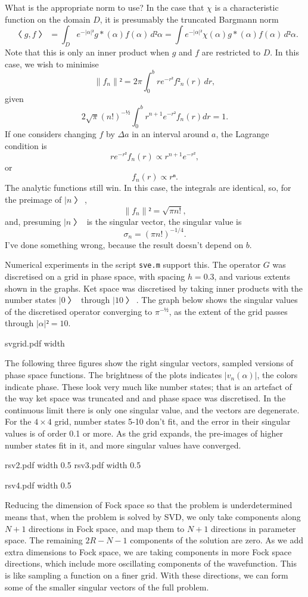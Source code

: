 What is the appropriate norm to use?  In the case that $χ$ is a characteristic function on the domain $D$, it is presumably the truncated Bargmann norm
$$〈g,f〉=\int_D e^{-|α|²}g*(α)f(α)\,d²α=\int e^{-|α|²}χ(α)g*(α)f(α)\,d²α.$$
Note that this is only an inner product when $g$ and $f$ are restricted to $D$.  In this case, we wish to minimise 
$$\|f_n\|²=2π\int_0^b re^{-r²}f²_n(r)\,dr,$$
given 
$$2\sqrt π(n!)^{-½}\int_0^b r^{n+1}e^{-r²}f_n(r)dr=1.$$
If one considers changing $f$ by $Δa$ in an interval around $a$, the Lagrange condition is
$$re^{-r²}f_n(r)\propto r^{n+1}e^{-r²},$$
or 
$$f_n(r)\propto rⁿ.$$
The analytic functions still win.  
In this case, the integrals are identical, so, for the preimage of $|n〉$,
$$\|f_n\|²=\sqrt{πn!},$$
and, presuming $|n〉$ is the singular vector, the singular value is
$$σ_n=(πn!)^{-1/4}.$$
I've done something wrong, because the result doesn't depend on $b$.


Numerical experiments in the script {\tt sve.m} support this.  The operator $G$ was discretised on a grid in phase space, with spacing $h=0.3$, and various extents shown in the graphs.  Ket space was discretised by taking inner products with the number states $|0〉$ through $|10〉$.  The graph below shows the singular values of the discretised operator converging to $π^{-½}$, as the extent of the grid passes through $|α|²=10$.

\centerline{\XeTeXpicfile svgrid.pdf width \hsize}

The following three figures show the right singular vectors, sampled versions of phase space functions.  The brightness of the plots indicates $|v_n(α)|$, the colors indicate phase.  These look very much like number states; that is an artefact of the way ket space was truncated and and phase space was discretised.  In the continuous limit there is only one singular value, and the vectors are degenerate.  For the $4×4$ grid, number states 5-10 don't fit, and the error in their singular values is of order 0.1 or more.  As the grid expands, the pre-images of higher number states fit in it, and more singular values have converged.

\centerline{\XeTeXpicfile rsv2.pdf width 0.5\hsize
\XeTeXpicfile rsv3.pdf width 0.5\hsize}
\centerline{\XeTeXpicfile rsv4.pdf width 0.5\hsize}

Reducing the dimension of Fock space so that the problem is underdetermined means that, when the problem is solved by SVD, we only take components along $N+1$ directions in Fock space, and map them to $N+1$ directions in parameter space.  The remaining $2R-N-1$ components of the solution are zero.  As we add extra dimensions to Fock space, we are taking components in more Fock space directions, which include more oscillating components of the wavefunction.  This is like sampling a function on a finer grid.  With these directions, we can form some of the smaller singular vectors of the full problem.

